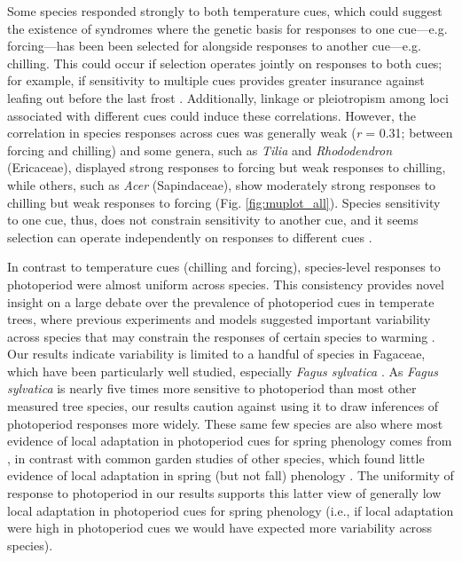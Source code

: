 \documentclass[11pt]{article}
\begin{document}
Some species responded strongly to both temperature cues, which could suggest the existence of syndromes where the genetic basis for responses to one cue---e.g. forcing---has been been selected for alongside responses to another cue---e.g. chilling. This could occur if selection operates jointly on responses to both cues; for example, if sensitivity to multiple cues provides greater insurance against leafing out before the last frost \citep{bonamour2019,memegan2021}. Additionally, linkage or pleiotropism among loci associated with different cues \citep{nakagawa2005} could induce these correlations. However, the correlation in species responses across cues was generally weak (\emph{r} = 0.31; between forcing and chilling) and some genera, such as \emph{Tilia} and \emph{Rhododendron} (Ericaceae), displayed strong responses to forcing but weak responses to chilling, while others, such as \emph{Acer} (Sapindaceae), show moderately strong responses to chilling but weak responses to forcing (Fig. \ref{fig:muplot_all}). Species sensitivity to one cue, thus, does not constrain sensitivity to another cue, and it seems selection can operate independently on responses to different cues \citep{bonamour2019}.

In contrast to temperature cues (chilling and forcing), species-level responses to photoperiod were almost uniform across species. This consistency provides novel insight on a large debate over the prevalence of photoperiod cues in temperate trees, where previous experiments \citep{Basler:2012,zohner2016} and models \citep[e.g.,][]{Hunter:1992jw,schaber20203} suggested important variability across species that may constrain the responses of certain species to warming \citep{way2015}. Our results indicate variability is limited to a handful of species in Fagaceae, which have been particularly well studied, especially \emph{Fagus sylvatica} \citep[e.g.,][]{Basler:2012,zohner2016,kramer2017}. As \emph{Fagus sylvatica} is nearly five times more sensitive to photoperiod than most other measured tree species, our results caution against using it to draw inferences of photoperiod responses more widely. These same few species are also where most evidence of local adaptation in photoperiod cues for spring phenology comes from \citep[e.g.,][]{kramer2017}, in contrast with common garden studies of other species, which found little evidence of local adaptation in spring (but not fall) phenology \citep{aitken2016}. The uniformity of response to photoperiod in our results supports this latter view of generally low local adaptation in photoperiod cues for spring phenology (i.e., if local adaptation were high in photoperiod cues we would have expected more variability across species). %
\end{document}
